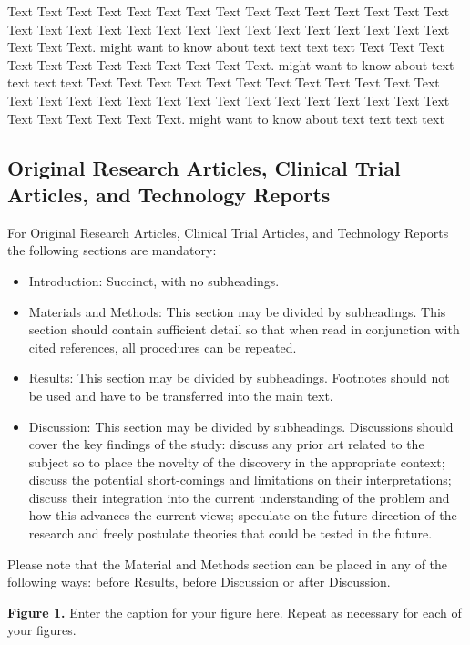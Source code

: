 \documentclass{frontiersENG} %
\begin{document}
Text Text Text Text Text Text  Text Text Text Text Text Text Text Text Text  Text Text Text Text Text Text Text Text Text Text  Text Text Text Text Text Text  Text Text.  \cite{Neuro2013} might want to know about  text text text text Text Text Text Text  Text Text Text Text Text Text  Text Text. \citep{Gene2012} might want to know about  text text text text
Text Text Text Text Text Text  Text Text Text Text Text Text Text Text Text  Text Text Text Text Text Text Text Text Text Text  Text Text Text Text Text Text  Text Text.  \cite{Neurobot2013} might want to know about  text text text text


\subsection{Original Research Articles, Clinical Trial Articles, and Technology Reports}

For Original Research Articles, Clinical Trial Articles, and Technology Reports the following sections are mandatory:

\begin{itemize}
\item Introduction: Succinct, with no subheadings.
\item Materials and Methods: This section may be divided by subheadings. This section should contain sufficient detail so that when read in conjunction with cited references, all procedures can be repeated.
\item Results: This section may be divided by subheadings. Footnotes should not be used and have to be transferred into the main text.
\item Discussion: This section may be divided by subheadings. Discussions should cover the key findings of the study: discuss any prior art related to the subject so to place the novelty of the discovery in the appropriate context; discuss the potential short-comings and limitations on their interpretations; discuss their integration into the current understanding of the problem and how this advances the current views; speculate on the future direction of the research and freely postulate theories that could be tested in the future.
\end{itemize}

Please note that the Material and Methods section can be placed in any of the following ways: before Results, before Discussion or after Discussion.



\textbf{Figure 1.}{ Enter the caption for your figure here.  Repeat as  necessary for each of your figures.}\label{fig:01}%
\end{document}
